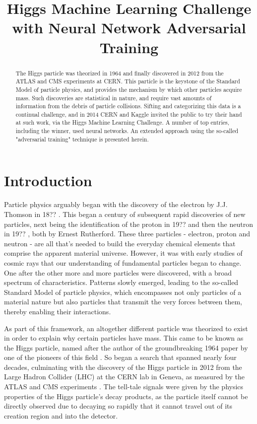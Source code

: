 \documentclass{article} %
\title{Higgs Machine Learning Challenge \\with Neural Network Adversarial Training}
\begin{document}
\maketitle

\begin{abstract}
The Higgs particle was theorized in 1964 and finally discovered in 2012 from the ATLAS and CMS experiments at CERN. This particle is the keystone of the Standard Model of particle physics, and provides the mechanism by which other particles acquire mass. Such discoveries are statistical in nature, and require vast amounts of information from the debris of particle collisions. Sifting and categorizing this data is a continual challenge, and in 2014 CERN and Kaggle invited the public to try their hand at such work, via the Higgs Machine Learning Challenge. A number of top entries, including the winner, used neural networks. An extended approach using the so-called "adversarial training" technique is presented herein.
\end{abstract}


\section{Introduction}
\label{sec:introduction}

Particle physics arguably began with the discovery of the electron by J.J. Thomson in 18?? \cite{???}. This began a century of subsequent rapid discoveries of new particles, next being the identification of the proton in 19?? \cite{???} and then the neutron in 19?? \cite{???}, both by Ernest Rutherford. These three particles - electron, proton and neutron - are all that's needed to build the everyday chemical elements that comprise the apparent material universe. However, it was with early studies of cosmic rays that our understanding of fundamental particles began to change. One after the other more and more particles were discovered, with a broad spectrum of characteristics. Patterns slowly emerged, leading to the so-called Standard Model of particle physics, which encompasses not only particles of a material nature but also particles that transmit the very forces between them, thereby enabling their interactions.

As part of this framework, an altogether different particle was theorized to exist in order to explain why certain particles have mass. This came to be known as the Higgs particle, named after the author of the groundbreaking 1964 paper by one of the pioneers of this field \cite{???}. So began a search that spanned nearly four decades, culminating with the discovery of the Higgs particle in 2012 from the Large Hadron Collider (LHC) at the CERN lab in Geneva, as measured by the ATLAS and CMS experiments \cite{???}. The tell-tale signals were given by the physics properties of the Higgs particle's decay products, as the particle itself cannot be directly observed due to decaying so rapidly that it cannot travel out of its creation region and into the detector.
\end{document}
